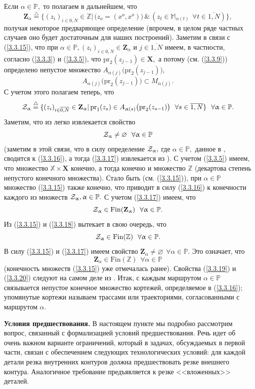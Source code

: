 \documentclass[11pt,twoside,openany]{report}
\newcommand{\bfn}{\begin{equation}}
\newcommand{\efn}{\end{equation}}
\newcommand{\df}{\stackrel{\triangle}{=}}
\newcommand{\ov}{\overline}
\newcommand{\al}{\alpha}
\newcommand{\su}{\subset}
\newcommand{\fa}{\forall}
\newcommand{\cz}{{\cal Z}}
\newcommand{\bbz}{{\mathbb Z}}
\newcommand{\bbm}{{\mathbb M}}
\newcommand{\bbx}{{\mathbb X}}
\newcommand{\bbp}{{\mathbb P}}
\newcommand{\emp}{\varnothing}
\begin{document}
Если $\al\in \bbp,$ то полагаем в дальнейшем, что
\bfn\label{3.3.15}\mathbf{Z}_\al \df \{(z_i)_{i\in\ov{0,N}}\in \bbz |\,\bigl(z_o =
(x^o,x^o)\bigl)\,\&\,(z_t\in \bbm_{\al(t)}\ \ \fa t\in \ov{1,N})\},
\efn
получая некоторое предваряющее определение (впрочем, в целом ряде частных случаев
оно будет достаточным для наших построений). Заметим в связи с (\ref{3.3.15}), что
при $\al\in \bbp, (z_i)_{i\in\ov{0,N}}\in \mathbf{Z}_\al$ и $j\in \ov{1,N}$ имеем,
в частности, согласно (\ref{3.3.3}) и (\ref{3.3.5}), что $\mathrm{pr}_2(z_{j-1})\in
\mathbf{X},$ а потому (см. (\ref{3.3.9})) определено непустое множество $A_{\al(j)}
\bigl(\mathrm{pr}_2(z_{j-1})\bigl),$
$$A_{\al(j)}\bigl(\mathrm{pr}_2(z_{j-1})\bigl)\su M_{\al(j)}.
$$
С учетом этого полагаем теперь, что
\bfn\label{3.3.16}\cz_\al \df \{(z_i)_{i\in\ov{0,N}}\in \mathbf{Z}_\al |\,
\mathrm{pr}_1(z_s)\in  A_{\al(s)}\bigl(\mathrm{pr}_2(z_{s-1})\bigl)\ \ \fa
s\in \ov{1,N}\}\ \ \fa \al\in \bbp.
\efn
Заметим, что из \cite[(3.21)]{Cha3`} легко извлекается свойство
\bfn\label{3.3.17}\cz_\al\neq \emp\ \ \fa \al\in \bbp
\efn
(заметим в этой связи, что в силу \cite[(3.5)--(3.7)]{Cha3`} определение
$\cz_\al,$ где $\al\in \bbp,$ данное в \cite[c.~64]{Cha3`}, сводится к
(\ref{3.3.16}), а тогда (\ref{3.3.17}) извлекается из \cite[(3.21)]{Cha3`}).
С учетом (\ref{3.3.5}) имеем, что множество $\bbx \times \mathbf{X}$ конечно,
а тогда конечно и множество $\bbz$ (декартова степень непустого конечного
множества). Стало быть (см. (\ref{3.3.15})), при $\al\in \bbp$ множество
(\ref{3.3.15}) также конечно, что приводит в силу (\ref{3.3.16}) к конечности
каждого из множеств $\cz_\al, \al\in \bbp.$ С учетом (\ref{3.3.17}) имеем, что
\bfn\label{3.3.18}\cz_\al\in \mathrm{Fin}(\mathbf{Z}_\al)\ \ \fa \al\in \bbp.
\efn
Из (\ref{3.3.15}) и (\ref{3.3.18}) вытекает в свою очередь, что
\bfn\label{3.3.19}\cz_\al\in \mathrm{Fin}(\bbz)\ \ \fa \al\in \bbp.
\efn
В силу (\ref{3.3.15}) и (\ref{3.3.17}) имеем свойство $\mathbf{Z}_\al\neq
\emp\ \ \fa \al\in \bbp.$ Это означает, что
\bfn\label{3.3.20}
\mathbf{Z}_\al\in \mathrm{Fin}(\bbz)\ \ \fa \al\in \bbp
\efn
(конечность множеств (\ref{3.3.15}) уже отмечалась ранее). Свойства
(\ref{3.3.19}) и (\ref{3.3.20}) следуют на самом деле из \cite[(3.21)]{Cha3`}.
Итак, с каждым маршрутом $\al\in\bbp$ связывается непустое конечное множество
кортежей, определяемое в (\ref{3.3.16}); упомянутые кортежи называем трассами
или траекториями, согласованными с маршрутом $\al.$

{\bf Условия предшествования.} В настоящем пункте мы подробно рассмотрим вопрос,
связанный с формализацией условий предшествования. Речь идет об очень важном
варианте ограничений, который в задачах, обсуждаемых в первой части, связан с
обеспечением следующих технологических условий: для каждой детали резка внутренних
контуров должна предшествовать резке внешнего контура. Аналогичное требование
предъявляется к резке <<вложенных>> деталей.
\end{document}

